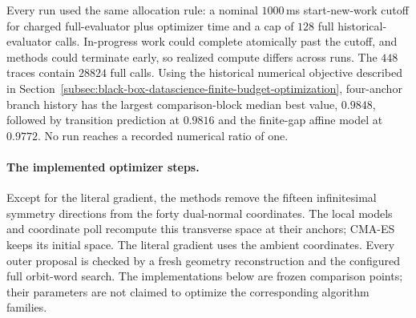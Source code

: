 Every run used the same allocation rule: a nominal \(1000\)\,ms
start-new-work cutoff for charged full-evaluator plus optimizer time and a cap
of \(128\) full historical-evaluator calls.  In-progress work could complete
atomically past the cutoff, and methods could terminate early, so realized
compute differs across runs.  The \(448\) traces contain \(28824\) full calls.
Using the historical numerical objective described in
Section~\ref{subsec:black-box-datascience-finite-budget-optimization},
four-anchor branch history has the largest comparison-block median best value,
\(0.9848\), followed by transition prediction at \(0.9816\) and the finite-gap
affine model at \(0.9772\).  No run reaches
a recorded numerical ratio of one.

\paragraph{The implemented optimizer steps.}
Except for the literal gradient, the methods remove the fifteen infinitesimal
symmetry directions from the forty dual-normal coordinates. The local models
and coordinate poll recompute this transverse space at their anchors;
CMA-ES keeps its initial space. The literal gradient uses the ambient
coordinates.  Every
outer proposal is checked by a fresh geometry reconstruction and the
configured full orbit-word search.  The implementations below are frozen
comparison points; their parameters are not claimed to optimize the
corresponding algorithm families.


